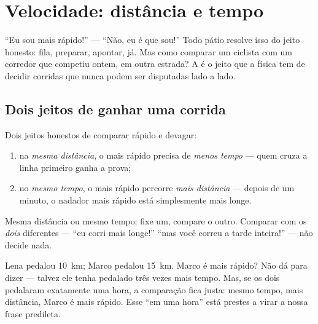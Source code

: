 \chapter{Velocidade: distância e tempo}\label{ch:g5:speed-distance-time}

``Eu sou mais rápido!'' --- ``Não, eu é que sou!'' Todo pátio resolve
isso do jeito honesto: fila, preparar, apontar, já. Mas como comparar
um ciclista com um corredor que competiu ontem, em outra estrada? A
 é o jeito que a física tem de decidir corridas que nunca
podem ser disputadas lado a lado.

\section{Dois jeitos de ganhar uma corrida}

\begin{proposition}\label{prop:g5:speed-distance-time:rules}
Dois jeitos honestos de comparar rápido e devagar:
\begin{enumerate}
  \item na \emph{mesma distância}, o mais rápido precisa de
        \emph{menos tempo} --- quem cruza a linha primeiro ganha a
        prova;
  \item no \emph{mesmo tempo}, o mais rápido percorre \emph{mais
        distância} --- depois de um minuto, o nadador mais rápido
        está simplesmente mais longe.
\end{enumerate}
Mesma distância ou mesmo tempo: fixe um, compare o outro. Comparar
com os \emph{dois} diferentes --- ``eu corri mais longe!'' ``mas você
correu a tarde inteira!'' --- não decide nada.
\end{proposition}

\begin{example}\label{ex:g5:speed-distance-time:fair}
Lena pedalou \qty{10}{km}; Marco pedalou \qty{15}{km}. Marco é mais
rápido? Não dá para dizer --- talvez ele tenha pedalado três vezes
mais tempo. Mas, se os dois pedalaram exatamente uma hora, a
comparação fica justa: mesmo tempo, mais distância, Marco é mais
rápido. Esse ``em uma hora'' está prestes a virar a nossa frase
predileta.
\end{example}

